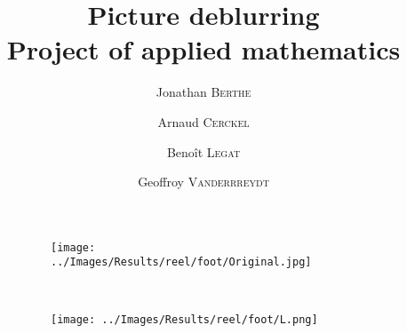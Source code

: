 \documentclass[10pt,svgnames,usenames,table]{beamer} %
\institute{LFSAB1507}
\title{\textbf{Picture deblurring}\\Project of applied mathematics }
\author{Jonathan \textsc{Berthe} \and Arnaud \textsc{Cerckel} \and Benoît \textsc{Legat} \and Geoffroy \textsc{Vanderrreydt}}
\date{}
\begin{document}
\begin{frame}
\maketitle
\vspace{-30pt}
\begin{figure}[h!]
\centering
\begin{subfigure}{0.4\textwidth}
\texttt{[image: ../Images/Results/reel/foot/Original.jpg]}
\end{subfigure}
~
\begin{subfigure}{0.4\textwidth}
\texttt{[image: ../Images/Results/reel/foot/L.png]}
\end{subfigure}
\end{figure}
\end{frame}


  
%









\end{document}
